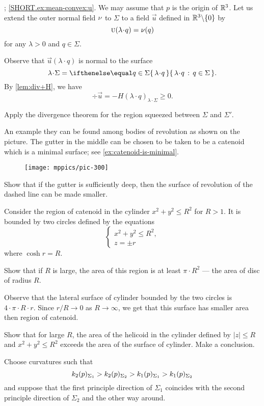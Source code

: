 \parbf{\ref{ex:mean-convex}}; \ref{SHORT.ex:mean-convex:u}.
We may assume that $p$ is the origin of $\mathbb{R}^3$.
Let us extend the outer normal field $\nu$ to $\Sigma$ to a field $\vec u$ defined in $\mathbb{R}^3\backslash\{0\}$ by
\[\vec u(\lambda\cdot q)=\Norm(q)\]
for any $\lambda>0$ and $q\in\Sigma$.

Observe that $\vec u(\lambda\cdot q)$ is normal to the surface 
\[\lambda\cdot\Sigma=\set{\lambda\cdot q}{q\in\Sigma}.\]
By \ref{lem:div+H}, we have
\[\div \vec u=-H(\lambda\cdot q)_{\lambda\cdot\Sigma}\ge 0.\]

 Apply the divergence theorem for the region squeezed between $\Sigma$ and $\Sigma'$.

An example they can be found among bodies of revolution as shown on the picture.
The gutter in the middle can be chosen to be taken to be a catenoid which is a minimal surface; see \ref{ex:catenoid-is-minimal}.
\begin{figure}[h!]
\vskip-0mm
\centering
\texttt{[image: mppics/pic-300]}
\vskip0mm
\end{figure}
Show that if the gutter is sufficiently deep, then the surface of revolution of the dashed line can be made smaller.


Consider the region of catenoid in the cylinder $x^2+y^2\le R^2$ for $R>1$.
It is bounded by two circles defined by the equations 
\[
\begin{cases}
x^2+y^2\le R^2,
\\
z=\pm r
\end{cases}
\]
where $\cosh r=R$.

Show that if $R$ is large, the area of this region is at least $\pi\cdot R^2$ --- the area of disc of radius $R$.

Observe that the lateral surface of cylinder bounded by the two circles is $4\cdot \pi\cdot R\cdot r$.
Since $r/R\to 0$ as $R\to \infty$, we get that this surface has smaller area then region of catenoid.


Show that for large $R$, the area of the helicoid in the cylinder defined by $|z|\le R$ and $x^2+y^2\le R^2$ exceeds the area of the surface of cylinder.
Make a conclusion.

Choose curvatures such that 
\[k_2(p)_{\Sigma_1}\z>k_2(p)_{\Sigma_2}> k_1(p)_{\Sigma_1}> k_1(p)_{\Sigma_2}\] and suppose that the first principle direction of $\Sigma_1$ coincides with the second principle direction of $\Sigma_2$ and the other way around.

